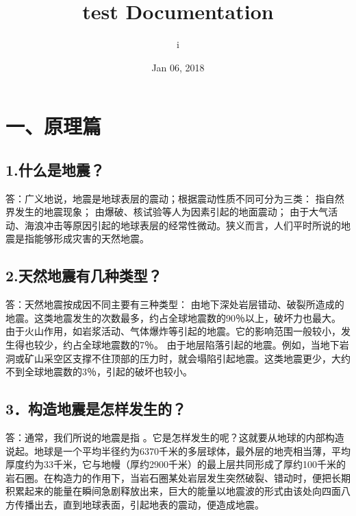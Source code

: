 \documentclass[a4paper,12pt,english]{sphinxmanual}
\title{test Documentation}
\date{Jan 06, 2018}
\author{i}
\begin{document}
\maketitle
\sphinxtableofcontents
{}\label{\detokenize{index::doc}}



\chapter{一、原理篇}
\label{\detokenize{index:id2}}\label{\detokenize{index:id1}}

\section{1.什么是地震？}
\label{\detokenize{index:id3}}
答：广义地说，地震是地球表层的震动；根据震动性质不同可分为三类：  指自然界发生的地震现象；   由爆破、核试验等人为因素引起的地面震动； 由于大气活动、海浪冲击等原因引起的地球表层的经常性微动。狭义而言，人们平时所说的地震是指能够形成灾害的天然地震。


\section{2.天然地震有几种类型？}
\label{\detokenize{index:id4}}
答：天然地震按成因不同主要有三种类型：  由地下深处岩层错动、破裂所造成的地震。这类地震发生的次数最多，约占全球地震数的90％以上，破坏力也最大。  由于火山作用，如岩浆活动、气体爆炸等引起的地震。它的影响范围一般较小，发生得也较少，约占全球地震数的7％。  由于地层陷落引起的地震。例如，当地下岩洞或矿山采空区支撑不住顶部的压力时，就会塌陷引起地震。这类地震更少，大约不到全球地震数的3％，引起的破坏也较小。


\section{3．构造地震是怎样发生的？}
\label{\detokenize{index:id5}}
答：通常，我们所说的地震是指  。它是怎样发生的呢？这就要从地球的内部构造说起。地球是一个平均半径约为6370千米的多层球体，最外层的地壳相当薄，平均厚度约为33千米，它与地幔（厚约2900千米）的最上层共同形成了厚约100千米的岩石圈。在构造力的作用下，当岩石圈某处岩层发生突然破裂、错动时，便把长期积累起来的能量在瞬间急剧释放出来，巨大的能量以地震波的形式由该处向四面八方传播出去，直到地球表面，引起地表的震动，便造成地震。
\end{document}
